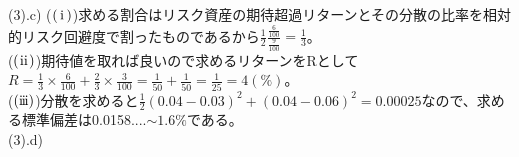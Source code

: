 \documentclass[11pt]{article}
\begin{document}
(3).c) ($\rm(\hspace{.18em}i\hspace{.18em})$)求める割合はリスク資産の期待超過リターンとその分散の比率を相対的リスク回避度で割ったものであるから$\frac{1}{2} \frac{\frac{6}{100}}{\frac{9}{100}} = \frac{1}{3}$。\\
($\rm(\hspace{.08em}ii\hspace{.08em})$)期待値を取れば良いので求めるリターンをRとして$R = \frac{1}{3} \times \frac{6}{100} + \frac{2}{3} \times \frac{3}{100} = \frac{1}{50} + \frac{1}{50} = \frac{1}{25} = 4(\%)$。\\
($\rm(i\hspace{-.08em}i\hspace{-.08em}i)$)分散を求めると$\frac{1}{2}{(0.04 - 0.03)^2 + (0.04 - 0.06)^2} = 0.00025$なので、求める標準偏差は0.0158....$\sim 1.6\%$である。\\
(3).d)
\end{document}
